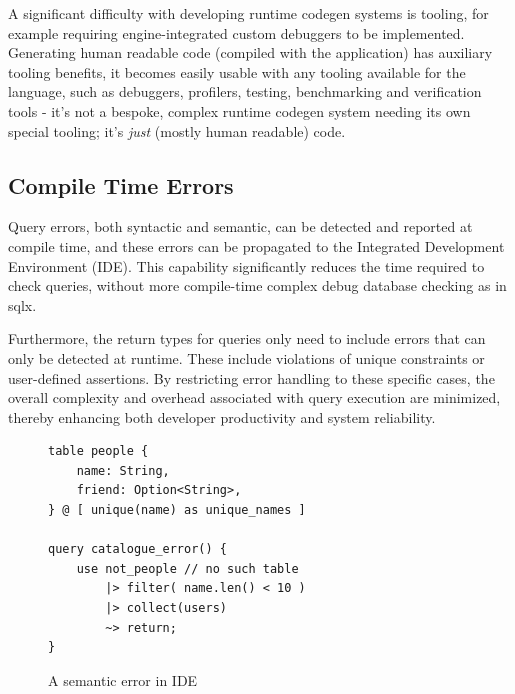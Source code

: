 \documentclass[conference]{IEEEtran}
\begin{document}
A significant difficulty with developing runtime codegen systems is tooling, for example requiring engine-integrated custom debuggers to be implemented.\cite{PracticalCodegen} 
Generating human readable code (compiled with the application) has auxiliary tooling benefits, it becomes easily usable with any tooling
available for the language, such as debuggers, profilers, testing, benchmarking and verification tools -
it's not a bespoke, complex runtime codegen system needing its own special tooling; it's \textit{just} (mostly human readable) code.  

\subsection{Compile Time Errors}

Query errors, both syntactic and semantic, can be detected and reported at compile time, and these errors
can be propagated to the Integrated Development Environment (IDE). This capability significantly reduces
the time required to check queries, without more compile-time complex debug database checking as in sqlx.

Furthermore, the return types for queries only need to include errors that can only be detected
at runtime. These include violations of unique constraints or user-defined assertions. By restricting
error handling to these specific cases, the overall complexity and overhead associated with query
execution are minimized, thereby enhancing both developer productivity and system reliability.

\begin{figure}[h]
    \begin{verbatim}
table people {
    name: String,
    friend: Option<String>,
} @ [ unique(name) as unique_names ]

query catalogue_error() {
    use not_people // no such table
        |> filter( name.len() < 10 ) 
        |> collect(users) 
        ~> return;
}
    \end{verbatim}
    \caption{A semantic error in IDE}
    \label{fig:query-error}
\end{figure}
\end{document}
